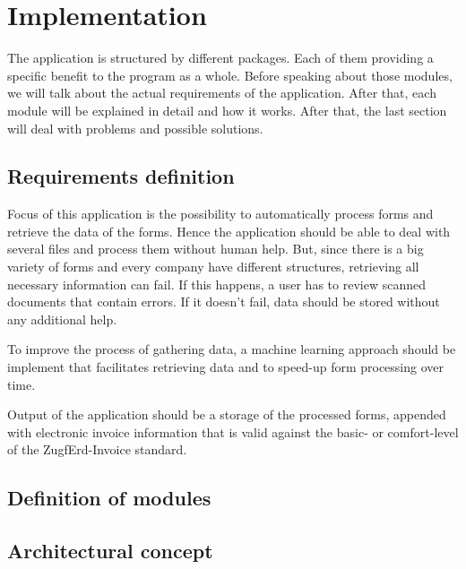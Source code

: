 %
% 

\chapter{Implementation}
\label{Implementation of the application}

The application is structured by different packages. Each of them providing a specific benefit to the program as a whole. Before speaking about those modules, we will talk about the actual requirements of the application. After that, each module will be explained in detail and how it works. After that, the last section will deal with problems and possible solutions.

\section{Requirements definition}

Focus of this application is the possibility to automatically process forms and retrieve the data of the forms. Hence the application should be able to deal with several files and process them without human help. But, since there is a big variety of forms and every company have different structures, retrieving all necessary information can fail. If this happens, a user has to review scanned documents that contain errors. If it doesn't fail, data should be stored without any additional help.

To improve the process of gathering data, a machine learning approach should be implement that facilitates retrieving data and to speed-up form processing over time.

Output of the application should be a storage of the processed forms, appended with electronic invoice information that is valid against the basic- or comfort-level of the ZugfErd-Invoice standard.

\section{Definition of modules}

\section{Architectural concept}

